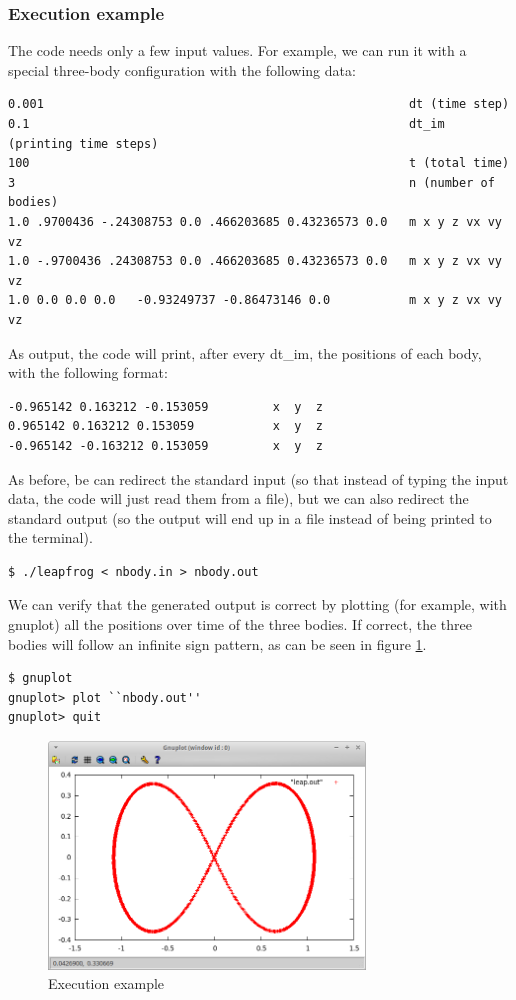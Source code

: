 \subsubsection{Execution example}\label{sec:execution_example}
The code needs only a few input values. For example, we can run it with a
special three-body configuration with the following data:

\begin{verbatim}
0.001                                                   dt (time step)
0.1                                                     dt_im (printing time steps)
100                                                     t (total time)
3                                                       n (number of bodies)
1.0 .9700436 -.24308753 0.0 .466203685 0.43236573 0.0   m x y z vx vy vz
1.0 -.9700436 .24308753 0.0 .466203685 0.43236573 0.0   m x y z vx vy vz
1.0 0.0 0.0 0.0   -0.93249737 -0.86473146 0.0           m x y z vx vy vz
\end{verbatim}

As output, the code will print, after every dt\_im, the positions of each body,
with the following format:

\begin{verbatim}
-0.965142 0.163212 -0.153059         x  y  z
0.965142 0.163212 0.153059           x  y  z
-0.965142 -0.163212 0.153059         x  y  z
\end{verbatim}

As before, be can redirect the standard input (so that instead of typing the
input data, the code will just read them from a file), but we can also redirect
the standard output (so the output will end up in a file instead of being
printed to the terminal).

\begin{verbatim}
$ ./leapfrog < nbody.in > nbody.out
\end{verbatim}

We can verify that the generated output is correct by plotting (for example,
with gnuplot) all the positions over time of the three bodies. If correct, the
three bodies will follow an infinite sign pattern, as can be seen in
figure \ref{fig:gnuplot.png}. 

\begin{verbatim}
$ gnuplot
gnuplot> plot ``nbody.out''
gnuplot> quit
\end{verbatim}

\begin{figure}[!htbp]
  \centering
  \label{fig:gnuplot.png}
  \includegraphics[width=0.75\textwidth]{graphics/gnuplot.png}
  \caption{Execution example}
\end{figure}

